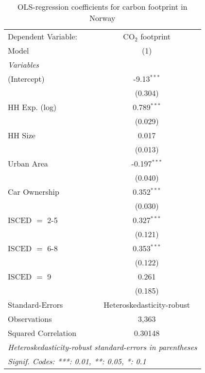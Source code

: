 
\begin{table}[htbp!]
   \centering
   \small
   \begin{adjustbox}{width = 1\textwidth, max height = 0.95\textheight, center}
      \begin{threeparttable}[b]
         \caption{\label{tab:OLS_2_NOR} OLS-regression coefficients for carbon footprint in Norway}
         \begin{tabular}{lc}
            \tabularnewline \midrule \midrule
            Dependent Variable: & CO$_{2}$ footprint\\  
            Model               & (1)\\  
            \midrule
            \emph{Variables}\\
            (Intercept)         & -9.13$^{***}$\\   
                                & (0.304)\\   
            HH Exp. (log)       & 0.789$^{***}$\\   
                                & (0.029)\\   
            HH Size             & 0.017\\   
                                & (0.013)\\   
            Urban Area          & -0.197$^{***}$\\   
                                & (0.040)\\   
            Car Ownership       & 0.352$^{***}$\\   
                                & (0.030)\\   
            ISCED $=$ 2-5       & 0.327$^{***}$\\   
                                & (0.121)\\   
            ISCED $=$ 6-8       & 0.353$^{***}$\\   
                                & (0.122)\\   
            ISCED $=$ 9         & 0.261\\   
                                & (0.185)\\   
            \midrule 
            Standard-Errors     & Heteroskedasticity-robust \\   
            Observations        & 3,363\\  
            Squared Correlation & 0.30148\\  
            \midrule \midrule
            \multicolumn{2}{l}{\emph{Heteroskedasticity-robust standard-errors in parentheses}}\\
            \multicolumn{2}{l}{\emph{Signif. Codes: ***: 0.01, **: 0.05, *: 0.1}}\\
         \end{tabular}
         

\end{threeparttable}
\end{adjustbox}
\end{table}

